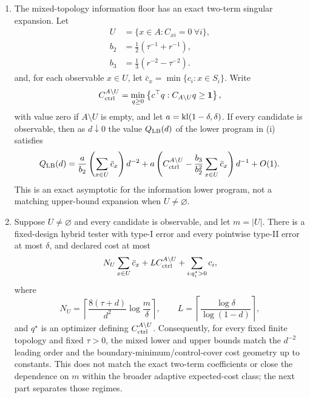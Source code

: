 \begin{theorem}
\begin{enumerate}[label=(\roman*)]
\item The mixed-topology information floor has an exact two-term singular
expansion.  Let
\begin{equation}\label{eq:formal-results-055}
\begin{aligned}
U&=\{x\in A:C_{xi}=0\ \forall i\},\\
b_2&=\tfrac12(\tau^{-1}+r^{-1}),\\
b_3&=\tfrac13(r^{-2}-\tau^{-2}).
\end{aligned}
\end{equation}
and, for each observable \(x\in U\), let
\(\bar c_x=\min\{c_i:x\in S_i\}\).  Write
\begin{equation}\label{eq:formal-results-056}
C_{\rm ctrl}^{A\setminus U}
=
\min_{q\ge0}
\left\{
c^\top q:C_{A\setminus U}q\ge\mathbf 1
\right\},
\end{equation}
with value zero if \(A\setminus U\) is empty, and let
\(a=\mathrm{kl}(1-\delta,\delta)\).  If every candidate is observable, then as
\(d\downarrow0\) the value \(Q_{\rm LB}(d)\) of the lower program in (i)
satisfies
\begin{equation}\label{eq:formal-results-057}
Q_{\rm LB}(d)
=
\frac{a}{b_2}
\left(\sum_{x\in U}\bar c_x\right)d^{-2}
+
a\left(
C_{\rm ctrl}^{A\setminus U}
-\frac{b_3}{b_2^2}\sum_{x\in U}\bar c_x
\right)d^{-1}
+O(1).
\end{equation}
This is an exact asymptotic for the information lower program, not a matching
upper-bound expansion when \(U\ne\varnothing\).

\item Suppose \(U\ne\varnothing\) and every candidate is observable, and let
\(m=|U|\).  There is a fixed-design hybrid tester with type-I error and every
pointwise type-II error at most \(\delta\), and declared cost at most
\begin{equation}\label{eq:formal-results-058}
N_U\sum_{x\in U}\bar c_x
+L C_{\rm ctrl}^{A\setminus U}
+\sum_{i:q_i^\star>0}c_i,
\end{equation}
where
\begin{equation}\label{eq:formal-results-059}
N_U=
\left\lceil
\frac{8(\tau+d)}{d^2}\log\frac{m}{\delta}
\right\rceil,
\qquad
L=\left\lceil\frac{\log\delta}{\log(1-d)}\right\rceil,
\end{equation}
and \(q^\star\) is an optimizer defining
\(C_{\rm ctrl}^{A\setminus U}\).  Consequently, for every fixed finite
topology and fixed \(\tau>0\), the mixed lower and upper bounds match the
\(d^{-2}\) leading order and the boundary-minimum/control-cover cost geometry
up to constants.  This does not match the exact two-term coefficients or close
the dependence on \(m\) within the broader adaptive expected-cost class; the
next part separates those regimes.


\end{enumerate}
\end{theorem}
